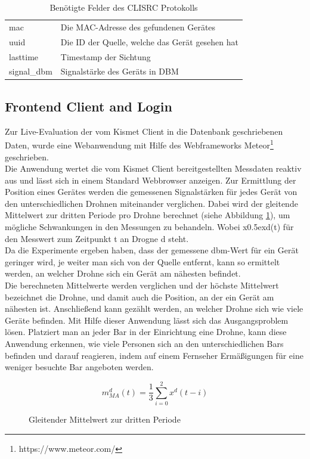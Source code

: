 \documentclass[a4paper]{spie}  %
\begin{document}
\begin{table}[!h]
	\centering
	\begin{tabular}{ | p{} | p{} | }
		\hline
		\rowcolor{blau} \multicolumn{2}{l|}{\textcolor{white}{\textbf{CLISRC}}}  \\ \hline
		mac & Die MAC-Adresse des gefundenen Gerätes \\ \hline
		uuid & Die ID der Quelle, welche das Gerät gesehen hat \\ \hline
		lasttime & Timestamp der Sichtung \\ \hline
		signal\_dbm & Signalstärke des Geräts in DBM \\
		\hline
	\end{tabular}
	\caption{Benötigte Felder des CLISRC Protokolls}
	\label{tab:cli}
\end{table}


\subsection{Frontend Client and Login}
Zur Live-Evaluation der vom Kismet Client in die Datenbank geschriebenen Daten, wurde eine Webanwendung mit Hilfe des Webframeworks Meteor\footnote{https://www.meteor.com/} geschrieben. \\
Die Anwendung wertet die vom Kismet Client bereitgestellten Messdaten reaktiv aus und lässt sich in einem Standard Webbrowser anzeigen. 
Zur Ermittlung der Position eines Gerätes werden die gemessenen Signalstärken für jedes Gerät von den unterschiedlichen Drohnen miteinander verglichen. Dabei wird der gleitende Mittelwert zur dritten Periode pro Drohne berechnet (siehe Abbildung \ref{eqn:middle}), um mögliche Schwankungen in den Messungen zu behandeln. Wobei x\raise0.5ex\hbox{d}(t) für den Messwert zum Zeitpunkt t an Drogne d steht.
\\Da die Experimente ergeben haben, dass der gemessene dbm-Wert für ein Gerät geringer wird, je weiter man sich von der Quelle entfernt, kann so ermittelt werden, an welcher Drohne sich ein Gerät am nähesten befindet. \\
Die berechneten Mittelwerte werden verglichen und der höchste Mittelwert bezeichnet die Drohne, und damit auch die Position, an der ein Gerät am nähesten ist. Anschließend kann gezählt werden, an welcher Drohne sich wie viele Geräte befinden. Mit Hilfe dieser Anwendung lässt sich das Ausgangsproblem lösen. Platziert man an jeder Bar in der Einrichtung eine Drohne, kann diese Anwendung erkennen, wie viele Personen sich an den unterschiedlichen Bars befinden und darauf reagieren, indem auf einem Fernseher Ermäßigungen für eine weniger besuchte Bar angeboten werden.
\begin{figure}
\begin{equation}
  \boxed{{ m }_{ MA }^{ d }(t) = \frac { 1 }{ 3 } \sum _{ i=0 }^{ 2 }{ { x }^{ d }(t-i) }}
\end{equation}
\caption{Gleitender Mittelwert zur dritten Periode}
\label{eqn:middle}
\end{figure}
\end{document}
